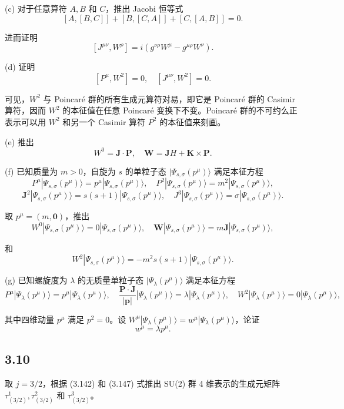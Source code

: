 (c) 对于任意算符 $ A, B $ 和 $ C $，推出 Jacobi 恒等式
$$ [A, [B, C]] + [B, [C, A]] + [C, [A, B]] = 0. \tag{3.263} $$

进而证明
$$ [J^{\mu\nu}, W^\rho] = i (g^{\nu\rho} W^\mu - g^{\mu\rho} W^\nu). \tag{3.264} $$

(d) 证明
$$ [P^\mu, W^2] = 0, \quad [J^{\mu\nu}, W^2] = 0. \tag{3.265} $$

可见，$ W^2 $ 与 Poincaré 群的所有生成元算符对易，即它是 Poincaré 群的 Casimir 算符，因而 $ W^2 $ 的本征值在任意 Poincaré 变换下不变。Poincaré 群的不可约么正表示可以用 $ W^2 $ 和另一个 Casimir 算符 $ P^2 $ 的本征值来刻画。

(e) 推出
$$ W^0 = \mathbf{J} \cdot \mathbf{P}, \quad \mathbf{W} = \mathbf{J} H + \mathbf{K} \times \mathbf{P}. \tag{3.266} $$

(f) 已知质量为 $ m > 0 $，自旋为 $ s $ 的单粒子态 $ |\Psi_{s,\sigma}(p^\mu)\rangle $ 满足本征方程
$$ P^\mu |\Psi_{s,\sigma}(p^\mu)\rangle = p^\mu |\Psi_{s,\sigma}(p^\mu)\rangle, \quad P^2 |\Psi_{s,\sigma}(p^\mu)\rangle = m^2 |\Psi_{s,\sigma}(p^\mu)\rangle, \tag{3.267} $$
$$ \mathbf{J}^2 |\Psi_{s,\sigma}(p^\mu)\rangle = s(s+1) |\Psi_{s,\sigma}(p^\mu)\rangle, \quad J^3 |\Psi_{s,\sigma}(p^\mu)\rangle = \sigma |\Psi_{s,\sigma}(p^\mu)\rangle. \tag{3.268} $$

取 $ p^\mu = (m, \mathbf{0}) $，推出
$$ W^0 |\Psi_{s,\sigma}(p^\mu)\rangle = 0 |\Psi_{s,\sigma}(p^\mu)\rangle, \quad \mathbf{W} |\Psi_{s,\sigma}(p^\mu)\rangle = m \mathbf{J} |\Psi_{s,\sigma}(p^\mu)\rangle, \tag{3.269} $$

和
$$ W^2 |\Psi_{s,\sigma}(p^\mu)\rangle = -m^2 s(s+1) |\Psi_{s,\sigma}(p^\mu)\rangle. \tag{3.270} $$

(g) 已知螺旋度为 $ \lambda $ 的无质量单粒子态 $ |\Psi_\lambda(p^\mu)\rangle $ 满足本征方程
$$ P^\mu |\Psi_\lambda(p^\mu)\rangle = p^\mu |\Psi_\lambda(p^\mu)\rangle, \quad \frac{\mathbf{P} \cdot \mathbf{J}}{|\mathbf{p}|} |\Psi_\lambda(p^\mu)\rangle = \lambda |\Psi_\lambda(p^\mu)\rangle, \quad W^2 |\Psi_\lambda(p^\mu)\rangle = 0 |\Psi_\lambda(p^\mu)\rangle, \tag{3.271} $$

其中四维动量 $ p^\mu $ 满足 $ p^2 = 0 $。设 $ W^\mu |\Psi_\lambda(p^\mu)\rangle = w^\mu |\Psi_\lambda(p^\mu)\rangle $，论证
$$ w^\mu = \lambda p^\mu. \tag{3.272} $$

\newpage
\subsection{3.10}
取 $ j = 3/2 $，根据 (3.142) 和 (3.147) 式推出 SU(2) 群 4 维表示的生成元矩阵 $ \tau_{(3/2)}^1, \tau_{(3/2)}^2 $ 和 $ \tau_{(3/2)}^3 $。




